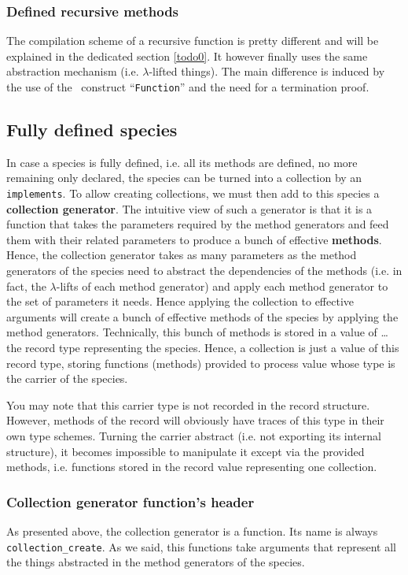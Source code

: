 \subsubsection{Defined recursive methods}
The compilation scheme of a recursive function is pretty different and
will be explained in the dedicated section \ref{todo0}. It however
finally uses the same abstraction mechanism (i.e. $\lambda$-lifted
things). The main difference is induced by the use of the \coq\
construct ``{\tt Function}'' and the need for a termination proof.



\subsection{Fully defined species}
In case a species is fully defined, i.e. all its methods are defined,
no more remaining only declared, the species can be turned into a
collection by an {\tt implements}. To allow creating collections, we
must then add to this species a {\bf collection generator}. The
intuitive view of such a generator is that it is a function that takes
the parameters required by the method generators and feed them with
their related parameters to produce a bunch of effective {\bf methods}.
Hence, the collection generator takes as many parameters as the method
generators of the species need to abstract the dependencies of the
methods (i.e. in fact, the $\lambda$-lifts of each method generator)
and apply each method generator to the set of parameters it needs.
Hence applying the collection to effective arguments will create a
bunch of effective methods of the species by applying the method
generators. Technically, this bunch of methods is stored in a value of
\ldots the record type representing the species. Hence, a collection
is just a value of this record type, storing functions (methods)
provided to process value whose type is the carrier of the species.

You may note that this carrier type is not recorded in the record
structure. However, methods of the record will obviously have traces
of this type in their own type schemes. Turning the carrier abstract
(i.e. not exporting its internal structure), it becomes impossible to
manipulate it except via the provided methods, i.e. functions stored
in the record value representing one collection.


\subsubsection{Collection generator function's header}
As presented above, the collection generator is a function. Its name
is always {\tt collection\_create}. As we said, this functions take
arguments that represent all the things abstracted in the method
generators of the species.

